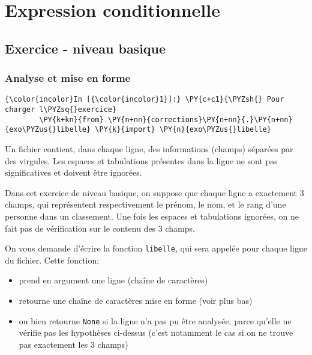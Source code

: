     
    
    
    

    

    \hypertarget{expression-conditionnelle}{%
\section{Expression conditionnelle}\label{expression-conditionnelle}}

    \hypertarget{exercice---niveau-basique}{%
\subsection{Exercice - niveau basique}\label{exercice---niveau-basique}}

    \hypertarget{analyse-et-mise-en-forme}{%
\subsubsection{Analyse et mise en
forme}\label{analyse-et-mise-en-forme}}

    \begin{Verbatim}[commandchars=\\\{\}]
{\color{incolor}In [{\color{incolor}1}]:} \PY{c+c1}{\PYZsh{} Pour charger l\PYZsq{}exercice}
        \PY{k+kn}{from} \PY{n+nn}{corrections}\PY{n+nn}{.}\PY{n+nn}{exo\PYZus{}libelle} \PY{k}{import} \PY{n}{exo\PYZus{}libelle}
\end{Verbatim}


    Un fichier contient, dans chaque ligne, des informations (champs)
séparées par des virgules. Les espaces et tabulations présentes dans la
ligne ne sont pas significatives et doivent être ignorées.

Dans cet exercice de niveau basique, on suppose que chaque ligne a
exactement 3 champs, qui représentent respectivement le prénom, le nom,
et le rang d'une personne dans un classement. Une fois les espaces et
tabulations ignorées, on ne fait pas de vérification sur le contenu des
3 champs.

On vous demande d'écrire la fonction \texttt{libelle}, qui sera appelée
pour chaque ligne du fichier. Cette fonction:

\begin{itemize}
\tightlist
\item
  prend en argument une ligne (chaîne de caractères)
\item
  retourne une chaîne de caractères mise en forme (voir plus bas)
\item
  ou bien retourne \texttt{None} si la ligne n'a pas pu être analysée,
  parce qu'elle ne vérifie pas les hypothèses ci-dessus (c'est notamment
  le cas si on ne trouve pas exactement les 3 champs)
\end{itemize}

